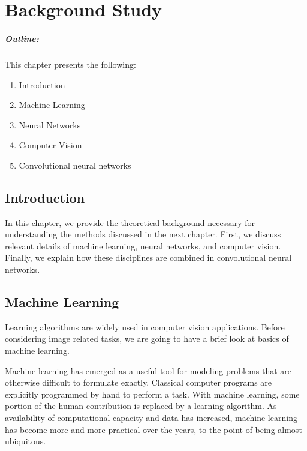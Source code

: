 \chapter{Background Study}
\label{chap2}


\vspace*{45 ex}



\paragraph*{Outline:} This chapter presents the following:
\begin{enumerate}
\setlength{\itemsep}{-0.3em}
\item Introduction
\item Machine Learning
\item Neural Networks
\item Computer Vision
\item Convolutional neural networks
\end{enumerate}

\newpage

\section{Introduction}
In this chapter, we provide the theoretical background necessary for understanding the methods discussed in the next chapter. First, we discuss relevant details of machine learning, neural networks, and computer vision. Finally, we explain how these disciplines are combined in convolutional neural networks.

\section{Machine Learning}
Learning algorithms are widely used in computer vision applications. Before considering image related tasks, we are going to have a brief look at basics of machine learning.

Machine learning has emerged as a useful tool for modeling problems that are otherwise difficult to formulate exactly. Classical computer programs are explicitly programmed by hand to perform a task. With machine learning, some portion of the human contribution is replaced by a learning algorithm. As availability of computational capacity and data has increased, machine learning has become more and more practical over the years, to the point of being almost ubiquitous.

